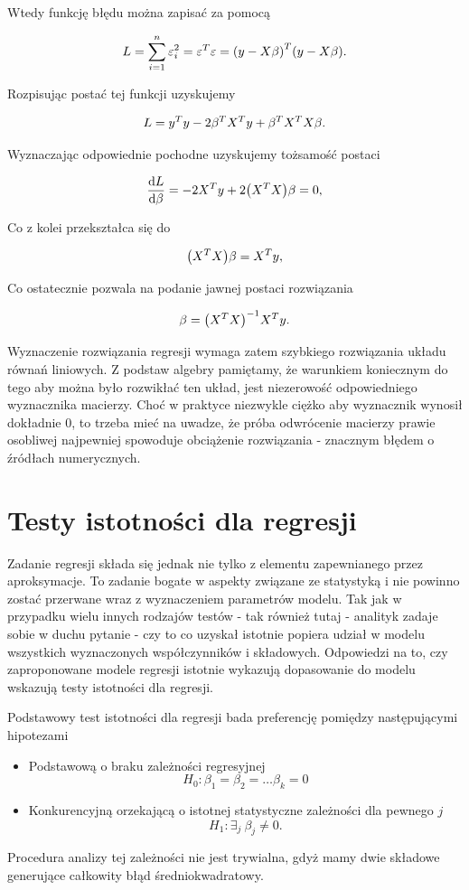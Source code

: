 \documentclass[10pt,a4paper]{book}
\begin{document}
Wtedy funkcję błędu można zapisać za pomocą 

$$
 L = \sum_{i=1}^{n} \epsilon^2_i = \transpose{\epsilon} \epsilon = \transpose{\bracket{y - X\beta} } \bracket{y - X \beta}.
$$

Rozpisując postać tej funkcji uzyskujemy

$$
L = \transpose{y}y - 2 \transpose{\beta} \transpose{X}y + \transpose{\beta} \transpose{X} X \beta.
$$

Wyznaczając odpowiednie pochodne uzyskujemy tożsamość postaci

$$
\ddx[{L}]{\beta} = -2 \transpose{X}y + 2 \bracket{\transpose{X}X} \beta = 0,
$$

Co z kolei przekształca się do 

$$
\bracket{\transpose{X}X} \beta	= \transpose{X} y,
$$

Co ostatecznie pozwala na podanie jawnej postaci rozwiązania

$$
\beta = \inverse{\bracket{\transpose{X}X} }\transpose{X}y.
$$

Wyznaczenie rozwiązania regresji wymaga zatem szybkiego rozwiązania układu równań liniowych. Z podstaw algebry pamiętamy, że warunkiem koniecznym do tego aby można było rozwikłać ten układ, jest niezerowość odpowiedniego wyznacznika macierzy. Choć w praktyce niezwykle ciężko aby wyznacznik wynosił dokładnie $0$, to trzeba mieć na uwadze, że próba odwrócenie macierzy prawie osobliwej najpewniej spowoduje obciążenie rozwiązania - znacznym błędem o źródłach numerycznych.

\section{Testy istotności dla regresji}

Zadanie regresji składa się jednak nie tylko z elementu zapewnianego przez aproksymacje. To zadanie bogate w aspekty związane ze statystyką i nie powinno zostać przerwane wraz z wyznaczeniem parametrów modelu. Tak jak w przypadku wielu innych rodzajów testów - tak również tutaj - analityk zadaje sobie w duchu pytanie - czy to co uzyskał istotnie popiera udział w modelu wszystkich wyznaczonych współczynników i składowych. Odpowiedzi na to, czy zaproponowane modele regresji istotnie wykazują dopasowanie do modelu wskazują testy istotności dla regresji.

Podstawowy test istotności dla regresji bada preferencję pomiędzy następującymi hipotezami\begin{itemize}
\item Podstawową o braku zależności regresyjnej
$$
H_0 : \beta_1 = \beta_2 = \ldots \beta_k = 0
$$
\item Konkurencyjną orzekającą o istotnej statystyczne zależności dla pewnego $j$
$$
H_1 : \exists_j \:\beta_j \neq 0.
$$
\end{itemize}
Procedura analizy tej zależności nie jest trywialna, gdyż mamy dwie składowe generujące całkowity błąd średniokwadratowy. 
\end{document}
